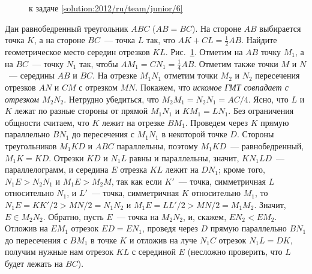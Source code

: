 \ifsolution
\begin{figure}\centering
    \caption{к задаче \ref{solution:2012/ru/team/junior/6}}
    \label{fig:solution:2012/ru/team/junior/6}
\end{figure}%
\fi %

\problem{}
Дан равнобедренный треугольник $ABC$ ($AB = BC$).
На стороне $AB$ выбирается точка $K$, а на стороне $BC$~--- точка $L$ так, что
$AK + CL = \frac{1}{2} AB$.
Найдите геометрическое место середин отрезков $KL$.
\solution
\label{solution:2012/ru/team/junior/6}
Рис.~\ref{fig:solution:2012/ru/team/junior/6}.
Отметим на $AB$ точку $M_1$, а на $BC$~--- точку $N_1$ так, чтобы
$A M_1 = C N_1 = \frac{1}{4} AB$.
Отметим также точки $M$ и $N$~--- середины $AB$ и $BC$.
На отрезке $M_1 N_1$ отметим точки $M_2$ и $N_2$ пересечения отрезков
$A N$ и $C M$ с отрезком $MN$.
Покажем, что \emph{искомое ГМТ совпадает с отрезком $M_2 N_2$}.
Нетрудно убедиться, что $M_2 M_1 = N_2 N_1 = AC / 4$.
Ясно, что $L$ и $K$ лежат по разные стороны от прямой $M_1 N_1$ и
$K M_1 = L N_1$.
Без ограничения общности считаем, что $K$ лежит на отрезке $B M_1$.
Проведем через $K$ прямую параллельно $B N_1$ до пересечения с $M_1 N_1$ в
некоторой точке $D$.
Стороны треугольников $M_1 K D$ и $ABC$ параллельны, поэтому $M_1 K D$~---
равнобедренный, $M_1 K = KD$.
Отрезки $KD$ и $N_1 L$ равны и параллельны, значит, $K N_1 L D$~---
параллелограмм, и середина $E$ отрезка $KL$ лежит на $D N_1$;
кроме того, $N_1 E > N_2 N_1$ и $M_1 E > M_2 M$, так как если
$K'$~--- точка, симметричная $L$ относительно $N_1$, и
$L'$~--- точка, симметричная $K$ относительно $M_1$, то
$N_1 E = K K' / 2 > MN / 2 = N_1 N_2$ и $M_1 E = L L' / 2 > M N / 2 = M_1 M_2$.
Значит, $E \in M_2 N_2$.
Обратно, пусть $E$~--- точка на $M_2 N_2$, и, скажем, $E N_2 < E M_2$.
Отложив на $E M_1$ отрезок $ED = E N_1$, проведя через $D$ прямую параллельно
$B N_1$ до пересечения с $B M_1$ в точке $K$ и отложив на луче $N_1 C$ отрезок
$N_1 L = DK$, получим нужные нам отрезок $KL$ с серединой $E$
(несложно проверить, что $L$ будет лежать на $BC$).
\endproblem
